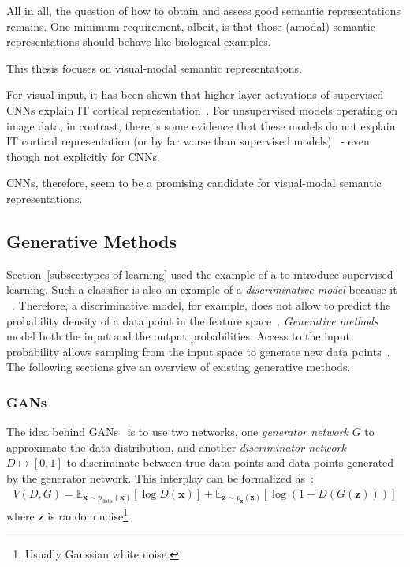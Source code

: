 All in all, the question of how to obtain and assess good semantic representations remains.
One minimum requirement, albeit, is that those (amodal) semantic representations should behave like biological examples.

This thesis focuses on visual-modal semantic representations.

For visual input, it has been shown that higher-layer activations of supervised \acp{CNN} explain \ac{IT} cortical representation~\citep{khaligh2014deep,cadieu2014deep}.
For unsupervised models operating on image data, in contrast, there is some evidence that these models do not explain \ac{IT} cortical representation (or by far worse than supervised models)~\citep{khaligh2014deep} - even though not explicitly for \acp{CNN}.

\acp{CNN}, therefore, seem to be a promising candidate for visual-modal semantic representations.

\subsection{Generative Methods}\label{subsec:generative-methods}

Section~\ref{subsec:types-of-learning} used the example of a  to introduce supervised learning.
Such a classifier is also an example of a \textit{discriminative model} because it ~\citep[p. 43]{bishop2006pattern}.
Therefore, a discriminative model, for example, does not allow to predict the probability density of a data point in the feature space~\citep[pp. 43,44]{bishop2006pattern}.
\textit{Generative methods} model both the input and the output probabilities.
Access to the input probability allows sampling from the input space to generate new data points~\citep[p. 43]{bishop2006pattern}.
The following sections give an overview of existing generative methods.

\subsubsection{\aclp{GAN}}\label{subsubsec:gans}

The idea behind \acp{GAN}~\citep{goodfellow2014gans} is to use two networks, one \textit{generator network} $G$ to approximate the data distribution, and another \textit{discriminator network} $D \mapsto [0, 1]$ to discriminate between true data points and data points generated by the generator network.
This interplay can be formalized as~\citep{goodfellow2014gans}:
\begin{align}
    V(D, G)=\mathbb{E}_{\bm{x} \sim p_{\text{data}}(\bm{x})}[\log D(\bm{x})]+\mathbb{E}_{\bm{z} \sim p_{\bm{z}}(\bm{z})}[\log (1-D(G(\bm{z})))]
\end{align}
where $\bm{z}$ is random noise\footnote{Usually Gaussian white noise.}.

